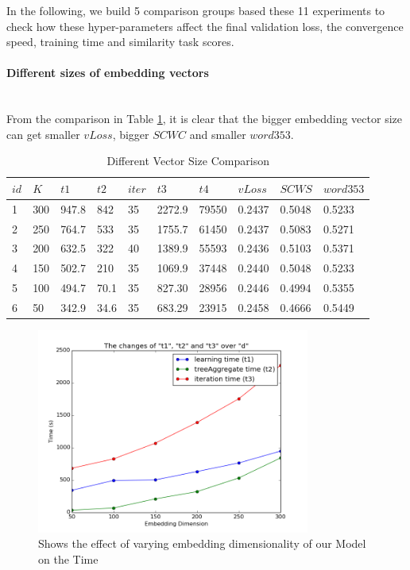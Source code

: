 In the following, we build 5 comparison groups based these 11 experiments to check how these hyper-parameters affect the final validation loss, the convergence speed, training time and similarity task scores. 

\paragraph{Different sizes of embedding vectors} \ \\
From the comparison in Table \ref{tab:group1}, it is clear that the bigger embedding vector size can get smaller $vLoss$, bigger $SCWC$ and smaller $word353$. 

\begin{table}[tb]
\caption{Different Vector Size Comparison} \label{tab:group1} 
\begin{center}
\begin{tabular}{|l|l|l|l|l|l|l|l|l|l|}
\hline
$id$ & $K$  & $t1$ & $t2$ & $iter$ & $t3$ & $t4$ &   $vLoss$  & 	$SCWS$ & 	$word353$	   \\ 
\hline
1 	& 300 	& 947.8	& 842	& 35	& 2272.9 &	79550  & 0.2437 &0.5048 & 0.5233  \\ 
\hline
2 	& 250 	& 764.7& 533	& 35	& 1755.7 &	61450  & 0.2437 &0.5083 & 0.5271 \\ 
\hline
3 	& 200 	& 632.5& 322	& 40	& 1389.9 &  55593  & 0.2436 &0.5103 & 0.5371 \\ 
\hline
4 	& 150 	& 502.7& 210	& 35	& 1069.9 &	37448  & 0.2440 &0.5048 & 0.5233 \\ 
\hline
5 	& 100 	& 494.7	& 70.1	& 35	& 827.30 &	28956  & 0.2446 &0.4994 & 0.5355  \\ 
\hline
6 	& 50 	& 342.9& 34.6	& 35	& 683.29 &	23915  & 0.2458 &0.4666 & 0.5449  \\ 
\hline
\end{tabular}
\end{center}
\end{table}


\begin{figure}[tb]
  \centering
	\includegraphics[width=0.8\textwidth]{vectime} 
	\caption{Shows the effect of varying embedding dimensionality of our Model on the Time}
	\label{fig:vec_time}
\end{figure}

